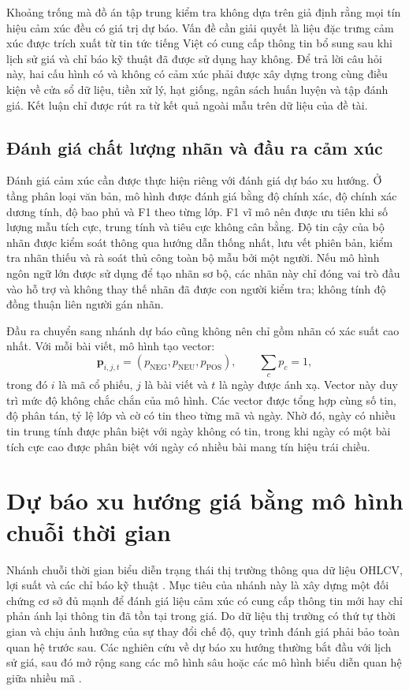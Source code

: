 \documentclass[12pt, a4paper, oneside]{report}
\begin{document}
Khoảng trống mà đồ án tập trung kiểm tra không dựa trên giả định rằng mọi tín hiệu cảm
xúc đều có giá trị dự báo. Vấn đề cần giải quyết là liệu đặc trưng cảm xúc được trích
xuất từ tin tức tiếng Việt có cung cấp thông tin bổ sung sau khi lịch sử giá và chỉ báo
kỹ thuật đã được sử dụng hay không. Để trả lời câu hỏi này, hai cấu hình có và không có
cảm xúc phải được xây dựng trong cùng điều kiện về cửa sổ dữ liệu, tiền xử lý, hạt giống,
ngân sách huấn luyện và tập đánh giá. Kết luận chỉ được rút ra từ kết quả ngoài mẫu
trên dữ liệu của đề tài.

\subsection{Đánh giá chất lượng nhãn và đầu ra cảm xúc}

Đánh giá cảm xúc cần được thực hiện riêng với đánh giá dự báo xu hướng. Ở tầng phân
loại văn bản, mô hình được đánh giá bằng độ chính xác, độ chính xác dương tính, độ bao
phủ và F1 theo từng lớp. F1 vĩ mô nên được ưu tiên khi số lượng mẫu tích cực, trung
tính và tiêu cực không cân bằng. Độ tin cậy của bộ nhãn được kiểm soát thông qua hướng
dẫn thống nhất, lưu vết phiên bản, kiểm tra nhãn thiếu và rà soát thủ công toàn bộ mẫu
bởi một người. Nếu mô hình ngôn ngữ lớn được sử dụng để tạo nhãn sơ bộ, các nhãn này
chỉ đóng vai trò đầu vào hỗ trợ và không thay thế nhãn đã được con người kiểm tra;
không tính độ đồng thuận liên người gán nhãn.

Đầu ra chuyển sang nhánh dự báo cũng không nên chỉ gồm nhãn có xác suất cao nhất. Với
mỗi bài viết, mô hình tạo vector:
\[
  \mathbf{p}_{i,j,t}=(p_{\mathrm{NEG}},p_{\mathrm{NEU}},p_{\mathrm{POS}}),
  \qquad \sum_c p_c=1,
\]
trong đó $i$ là mã cổ phiếu, $j$ là bài viết và $t$ là ngày được ánh xạ. Vector này
duy trì mức độ không chắc chắn của mô hình. Các vector được tổng hợp cùng số tin,
độ phân tán, tỷ lệ lớp và cờ có tin theo từng mã và ngày. Nhờ đó, ngày có nhiều tin
trung tính được phân biệt với ngày không có tin, trong khi ngày có một bài tích cực cao
được phân biệt với ngày có nhiều bài mang tín hiệu trái chiều.
\section{Dự báo xu hướng giá bằng mô hình chuỗi thời gian}
\label{sec:tq-timeseries}

Nhánh chuỗi thời gian biểu diễn trạng thái thị trường thông qua dữ liệu OHLCV, lợi suất và các chỉ báo kỹ thuật \cite{Wilder1978_rsi,Appel2005_macd}. Mục tiêu của nhánh này là xây dựng một đối chứng cơ sở đủ mạnh để đánh giá liệu cảm xúc có cung cấp thông tin mới hay chỉ phản ánh lại thông tin đã tồn tại trong giá. Do dữ liệu thị trường có thứ tự thời gian và chịu ảnh hưởng của sự thay đổi chế độ, quy trình đánh giá phải bảo toàn quan hệ trước sau. Các nghiên cứu về dự báo xu hướng thường bắt đầu với lịch sử giá, sau đó mở rộng sang các mô hình sâu hoặc các mô hình biểu diễn quan hệ giữa nhiều mã \cite{Feng2018_181009936v2,Xu2021_211013716v2}.
\end{document}
